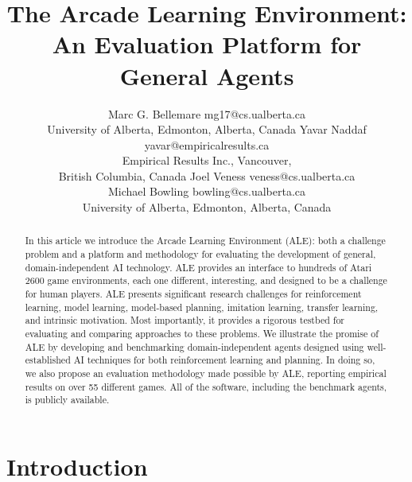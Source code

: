 \documentclass[twoside,11pt]{article}
\newif\ifjair
\begin{document}
\title{The Arcade Learning Environment:\\An Evaluation Platform for General Agents}

\author{\name Marc G. Bellemare \email mg17@cs.ualberta.ca \\
\addr University of Alberta, Edmonton, Alberta, Canada 
\AND
\name Yavar Naddaf \email yavar@empiricalresults.ca \\
\addr Empirical Results Inc., Vancouver, \\
British Columbia, Canada 
\AND
\name Joel Veness \email veness@cs.ualberta.ca \\
\name Michael Bowling \email bowling@cs.ualberta.ca \\
\addr University of Alberta, Edmonton, Alberta, Canada}


\ifjair\else
\thispagestyle{empty}
\fi

\maketitle

\begin{abstract}
In this article we introduce the Arcade Learning Environment (ALE): both a challenge problem and a platform and methodology for evaluating the development of general, domain-independent AI technology.  ALE provides an interface to hundreds of Atari 2600 game environments, each one different, interesting, and designed to be a challenge for human players.  ALE presents significant research challenges for reinforcement learning, model learning, model-based planning, imitation learning, transfer learning, and intrinsic motivation.  Most importantly, it provides a rigorous testbed for evaluating and comparing approaches to these problems.  We illustrate the promise of ALE by developing and benchmarking domain-independent agents designed using well-established AI techniques for both reinforcement learning and planning.  In doing so, we also propose an evaluation methodology made possible by ALE, reporting empirical results on over 55 different games.  All of the software, including the benchmark agents, is publicly available.
\end{abstract}

\section{Introduction}
\end{document}
